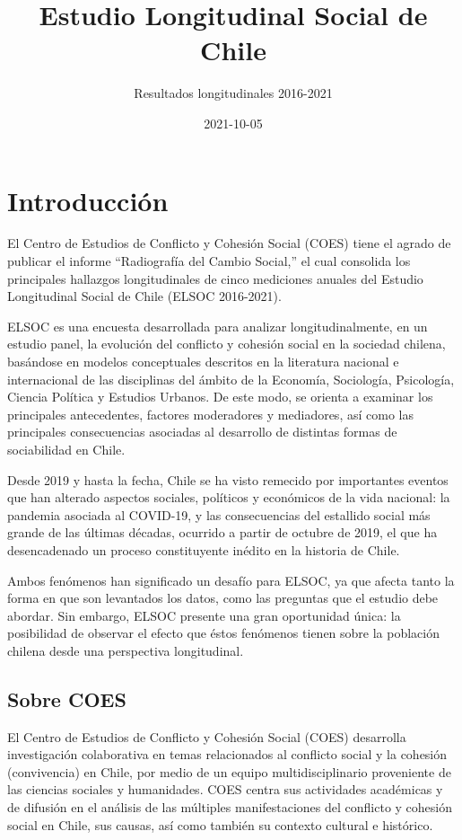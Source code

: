 \documentclass[
  12pt,
  openany]{book}
\title{Estudio Longitudinal Social de Chile}
\subtitle{Resultados longitudinales 2016-2021}
\author{}
\date{\vspace{-2.5em}2021-10-05}
\begin{document}
\maketitle

\listoftables
\listoffigures
{}
\hypertarget{introducciuxf3n}{%
\chapter{Introducción}\label{introducciuxf3n}}

El Centro de Estudios de Conflicto y Cohesión Social (COES) tiene el agrado de publicar el informe ``Radiografía del Cambio Social,'' el cual consolida los principales hallazgos longitudinales de cinco mediciones anuales del Estudio Longitudinal Social de Chile (ELSOC 2016-2021).

ELSOC es una encuesta desarrollada para analizar longitudinalmente, en un estudio panel, la evolución del conflicto y cohesión social en la sociedad chilena, basándose en modelos conceptuales descritos en la literatura nacional e internacional de las disciplinas del ámbito de la Economía, Sociología, Psicología, Ciencia Política y Estudios Urbanos. De este modo, se orienta a examinar los principales antecedentes, factores moderadores y mediadores, así como las principales consecuencias asociadas al desarrollo de distintas formas de sociabilidad en Chile.

Desde 2019 y hasta la fecha, Chile se ha visto remecido por importantes eventos que han alterado aspectos sociales, políticos y económicos de la vida nacional: la pandemia asociada al COVID-19, y las consecuencias del estallido social más grande de las últimas décadas, ocurrido a partir de octubre de 2019, el que ha desencadenado un proceso constituyente inédito en la historia de Chile.

Ambos fenómenos han significado un desafío para ELSOC, ya que afecta tanto la forma en que son levantados los datos, como las preguntas que el estudio debe abordar. Sin embargo, ELSOC presente una gran oportunidad única: la posibilidad de observar el efecto que éstos fenómenos tienen sobre la población chilena desde una perspectiva longitudinal.

\hypertarget{sobre-coes}{%
\section{Sobre COES}\label{sobre-coes}}

El Centro de Estudios de Conflicto y Cohesión Social (COES) desarrolla investigación colaborativa en temas relacionados al conflicto social y la cohesión (convivencia) en Chile, por medio de un equipo multidisciplinario proveniente de las ciencias sociales y humanidades. COES centra sus actividades académicas y de difusión en el análisis de las múltiples manifestaciones del conflicto y cohesión social en Chile, sus causas, así como también su contexto cultural e histórico.
\end{document}
